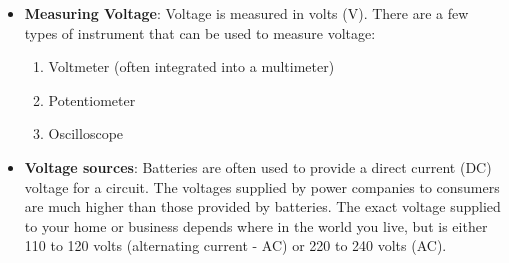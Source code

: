 \documentclass{report}
\begin{document}
\begin{itemize}
            \bigbreak \noindent 
            Getting electrons to all flow in the same direction doesn't happen by accident - we need to do something in order to make it happen. We do this by using voltage.
            \bigbreak \noindent 
            A voltage is the difference in electric charge between two points. So, for example, if you have one piece of metal that has an abundance of positive ions (positively charged atoms - they don't have enough electrons), and another piece of metal with an abundance of negative ions (negatively charged atoms - they have too many electrons), a voltage (difference in electric charge) exists between the two pieces. If you then attach a conductor between them, electrons (negatively charged particles) flow from one piece of metal to the other. The flow of electrons continues until all of the atoms in the circuit are electrically neutral.
            \bigbreak \noindent 
            \bigbreak \noindent 
            Once the electrons stop flowing, they revert to their random movement between atoms as shown earlier. 
            \bigbreak \noindent 
            So, we can conclude that a voltage, which is a difference in electric charge between two points, needs to exist in order for electric current to flow.
            \bigbreak \noindent 
            Voltage can also be referred to as potential difference. Electromotive force (EMF) is the voltage developed by any source of electrical energy, for example, a battery. It is often defined as the source's electrical potential in a circuit.
        \item \textbf{Measuring Voltage}: Voltage is measured in volts (V). There are a few types of instrument that can be used to measure voltage:
            \begin{enumerate}
                \item Voltmeter (often integrated into a multimeter)
                \item Potentiometer
                \item Oscilloscope
            \end{enumerate}
        \item \textbf{Voltage sources}: Batteries are often used to provide a direct current (DC) voltage for a circuit.
            \bigbreak \noindent 
            The voltages supplied by power companies to consumers are much higher than those provided by batteries. The exact voltage supplied to your home or business depends where in the world you live, but is either 110 to 120 volts (alternating current - AC) or 220 to 240 volts (AC).

\end{itemize}
\end{document}
